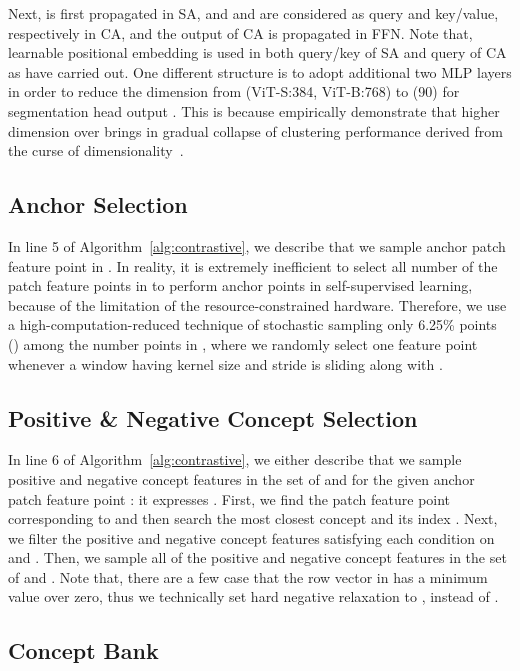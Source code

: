 \documentclass{article} \usepackage{iclr2024_conference,times}
\begin{document}
Next,  is first propagated in SA, and  and  are considered as query and key/value, respectively in CA, and the output of CA is propagated in FFN. Note that, learnable positional embedding is used in both query/key of SA and query of CA as \citet{carion2020end} have carried out. One different structure is to adopt additional two MLP layers in order to reduce the dimension from  (ViT-S:384, ViT-B:768) to  (90) for segmentation head output . This is because \citet{koenig2023uncovering} empirically demonstrate that higher dimension  over  brings in gradual collapse of clustering performance derived from the curse of dimensionality~\citep{assent2012clustering}.

\subsection{Anchor Selection}

In line 5 of Algorithm~\ref{alg:contrastive}, we describe that we sample anchor patch feature point  in . In reality, it is extremely inefficient to select all number  of the patch feature points in  to perform anchor points in self-supervised learning, because of the limitation of the resource-constrained hardware. Therefore, we use a high-computation-reduced technique of stochastic sampling only 6.25\% points () among the number  points in , where we randomly select one feature point whenever a window having kernel size  and stride  is sliding along with .

\subsection{Positive \& Negative Concept Selection}
In line 6 of Algorithm~\ref{alg:contrastive}, we either describe that we sample positive and negative concept features  in the set of  and  for the given anchor patch feature point : it expresses . First, we find the patch feature point  corresponding to  and then search the most closest concept  and its index . Next, we filter the positive  and negative  concept features satisfying each condition on  and . Then, we sample all of the positive and negative concept features in the set of  and . Note that, there are a few case that the row vector in  has a minimum value over zero, thus we technically set hard negative relaxation to , instead of .

\subsection{Concept Bank}
\end{document}

